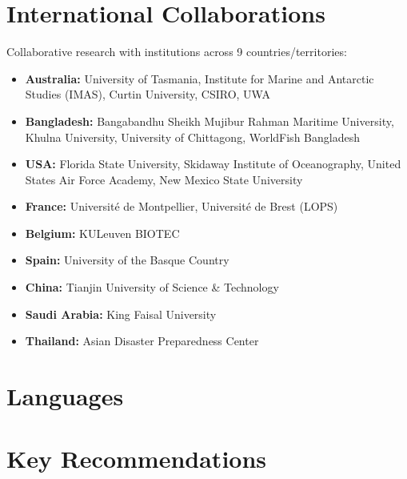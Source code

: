 \documentclass[11pt,a4paper,sans]{moderncv}
\begin{document}
\section{International Collaborations}
Collaborative research with institutions across 9 countries/territories:
\begin{itemize}
  \item \textbf{Australia:} University of Tasmania, Institute for Marine and Antarctic Studies (IMAS), Curtin University, CSIRO, UWA
  \item \textbf{Bangladesh:} Bangabandhu Sheikh Mujibur Rahman Maritime University, Khulna University, University of Chittagong, WorldFish Bangladesh
  \item \textbf{USA:} Florida State University, Skidaway Institute of Oceanography, United States Air Force Academy, New Mexico State University
  \item \textbf{France:} Université de Montpellier, Université de Brest (LOPS)
  \item \textbf{Belgium:} KULeuven BIOTEC
  \item \textbf{Spain:} University of the Basque Country
  \item \textbf{China:} Tianjin University of Science \& Technology
  \item \textbf{Saudi Arabia:} King Faisal University
  \item \textbf{Thailand:} Asian Disaster Preparedness Center
\end{itemize}

\section{Languages}

\section{Key Recommendations}

\end{document}
